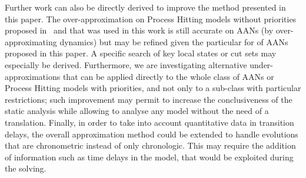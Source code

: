 Further work can also be directly derived to improve the method presented in this paper.
The over-approximation on Process Hitting models without priorities proposed in~\cite{PMR12-MSCS}
and that was used in this work
is still accurate on AANs (by over-approximating dynamics)
but may be refined given the particular for of AANs proposed in this paper.
A specific search of key local states or cut sets \cite{PAK13-CAV} may especially be derived.
Furthermore, we are investigating alternative under-approximations that can be
applied directly to the whole class of AANs or Process Hitting models with priorities,
and not only to a sub-class with particular restrictions;
such improvement may permit to increase the conclusiveness of the static analysis
while allowing to analyse any model without the need of a translation.
Finally, in order to take into account quantitative data in transition delays, the overall approximation method could be extended to handle evolutions that are chronometric instead of only chronologic.
This may require the addition of information such as time delays in the model,
that would be exploited during the solving.

